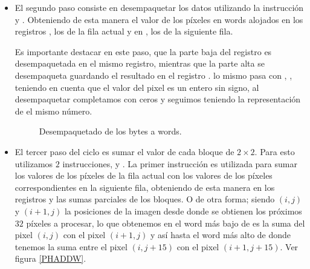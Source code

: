 \begin{itemize}
  \item El segundo paso consiste en desempaquetar los datos utilizando la instrucción  y . Obteniendo de esta manera el valor de los píxeles en words alojados en los registros ,  los de la fila actual y en ,  los de la siguiente fila.

  Es importante destacar en este paso, que la parte baja del registro  es desempaquetada en el mismo registro, mientras que la parte alta se desempaqueta guardando el resultado en el registro . lo mismo pasa con , , teniendo en cuenta que el valor del pixel es un entero sin signo, al desempaquetar completamos con ceros y seguimos teniendo la representación de el mismo número.

  \begin{figure}[H]
    \centering
    \caption{Desempaquetado de los bytes a words.}
    \label{PUNPCK}
  \end{figure}

  \item El tercer paso del ciclo es sumar el valor de cada bloque de $2 \times 2$. Para esto utilizamos $2$ instrucciones,  y . La primer instrucción es utilizada para sumar los valores de los píxeles de la fila actual con los valores de los píxeles correspondientes en la siguiente fila, obteniendo de esta manera en los registros  y  las sumas parciales de los bloques. O de otra forma; siendo $(i,j)$ y $(i+1,j)$ la posiciones de la imagen desde donde se obtienen los próximos $32$ píxeles a procesar, lo que obtenemos en el word más bajo de  es la suma del pixel $(i,j)$ con el pixel $(i+1,j)$ y así hasta el word más alto de  donde tenemos la suma entre el pixel $(i,j+15)$ con el pixel $(i+1,j+15)$. Ver figura \ref{PHADDW}.


\end{itemize}
